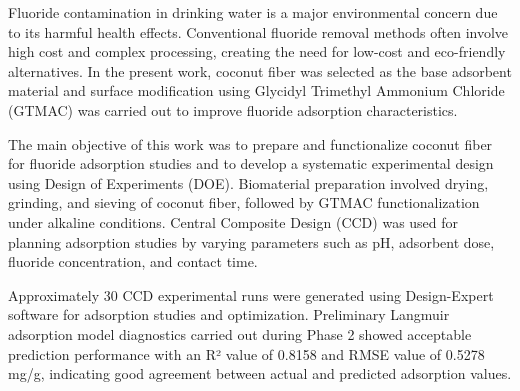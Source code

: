 \vspace{-1cm}



Fluoride contamination in drinking water is a major environmental concern due to its harmful health effects. Conventional fluoride removal methods often involve high cost and complex processing, creating the need for low-cost and eco-friendly alternatives. In the present work, coconut fiber was selected as the base adsorbent material and surface modification using Glycidyl Trimethyl Ammonium Chloride (GTMAC) was carried out to improve fluoride adsorption characteristics. 


The main objective of this work was to prepare and functionalize coconut fiber for fluoride adsorption studies and to develop a systematic experimental design using Design of Experiments (DOE). Biomaterial preparation involved drying, grinding, and sieving of coconut fiber, followed by GTMAC functionalization under alkaline conditions. Central Composite Design (CCD) was used for planning adsorption studies by varying parameters such as pH, adsorbent dose, fluoride concentration, and contact time. 


Approximately 30 CCD experimental runs were generated using Design-Expert software for adsorption studies and optimization. Preliminary Langmuir adsorption model diagnostics carried out during Phase 2 showed acceptable prediction performance with an R² value of 0.8158 and RMSE value of 0.5278 mg/g, indicating good agreement between actual and predicted adsorption values. 

 

\pagebreak